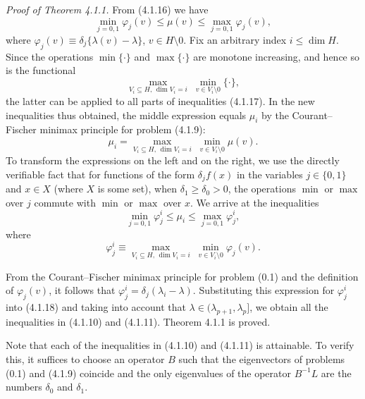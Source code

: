 \documentclass[11pt,oneside]{book}
\begin{document}
\textit{Proof of Theorem 4.1.1.} From (4.1.16) we have
\[
\min_{j=0,1} \varphi_j(v) \leqslant \mu(v) \leqslant \max_{j=0,1} \varphi_j(v), \tag{4.1.17}
\]
where $\varphi_j(v) \equiv \delta_j \{ \lambda(v) - \lambda \}$, $v \in H \setminus 0$. Fix an arbitrary index $i \leqslant \dim H$. Since the operations $\min\{\cdot\}$ and $\max\{\cdot\}$ are monotone increasing, and hence so is the functional
\[
\max_{V_i \subseteq H,\, \dim V_i = i} \; \min_{v \in V_i \setminus 0} \{\cdot\},
\]
the latter can be applied to all parts of inequalities (4.1.17). In the new inequalities thus obtained, the middle expression equals $\mu_i$ by the Courant--Fischer minimax principle for problem (4.1.9):
\[
\mu_i = \max_{V_i \subseteq H,\, \dim V_i = i} \; \min_{v \in V_i \setminus 0} \mu(v).
\]
To transform the expressions on the left and on the right, we use the directly verifiable fact that for functions of the form $\delta_j f(x)$ in the variables $j \in \{0, 1\}$ and $x \in X$ (where $X$ is some set), when $\delta_1 \geqslant \delta_0 > 0$, the operations $\min$ or $\max$ over $j$ commute with $\min$ or $\max$ over $x$. We arrive at the inequalities
\[
\min_{j=0,1} \varphi_j^i \leqslant \mu_i \leqslant \max_{j=0,1} \varphi_j^i, \tag{4.1.18}
\]
where
\[
\varphi_j^i \equiv \max_{V_i \subseteq H,\, \dim V_i = i} \; \min_{v \in V_i \setminus 0} \varphi_j(v).
\]

From the Courant--Fischer minimax principle for problem (0.1) and the definition of $\varphi_j(v)$, it follows that $\varphi_j^i = \delta_j (\lambda_i - \lambda)$. Substituting this expression for $\varphi_j^i$ into (4.1.18) and taking into account that $\lambda \in (\lambda_{p+1}, \lambda_p]$, we obtain all the inequalities in (4.1.10) and (4.1.11). Theorem 4.1.1 is proved.

Note that each of the inequalities in (4.1.10) and (4.1.11) is attainable. To verify this, it suffices to choose an operator $B$ such that the eigenvectors of problems (0.1) and (4.1.9) coincide and the only eigenvalues of the operator $B^{-1} L$ are the numbers $\delta_0$ and $\delta_1$.
\end{document}
